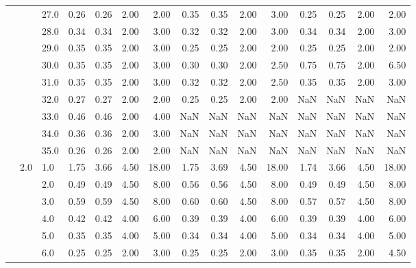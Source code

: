 \begin{tabular}{lllrrrrrrrrrrrr}
      &     & 27.0 &       0.26 &      0.26 & 2.00 &   2.00 &       0.35 &      0.35 & 2.00 &   3.00 &       0.25 &      0.25 & 2.00 &   2.00 \\
      &     & 28.0 &       0.34 &      0.34 & 2.00 &   3.00 &       0.32 &      0.32 & 2.00 &   3.00 &       0.34 &      0.34 & 2.00 &   3.00 \\
      &     & 29.0 &       0.35 &      0.35 & 2.00 &   3.00 &       0.25 &      0.25 & 2.00 &   2.00 &       0.25 &      0.25 & 2.00 &   2.00 \\
      &     & 30.0 &       0.35 &      0.35 & 2.00 &   3.00 &       0.30 &      0.30 & 2.00 &   2.50 &       0.75 &      0.75 & 2.00 &   6.50 \\
      &     & 31.0 &       0.35 &      0.35 & 2.00 &   3.00 &       0.32 &      0.32 & 2.00 &   2.50 &       0.35 &      0.35 & 2.00 &   3.00 \\
      &     & 32.0 &       0.27 &      0.27 & 2.00 &   2.00 &       0.25 &      0.25 & 2.00 &   2.00 &        NaN &       NaN &  NaN &    NaN \\
      &     & 33.0 &       0.46 &      0.46 & 2.00 &   4.00 &        NaN &       NaN &  NaN &    NaN &        NaN &       NaN &  NaN &    NaN \\
      &     & 34.0 &       0.36 &      0.36 & 2.00 &   3.00 &        NaN &       NaN &  NaN &    NaN &        NaN &       NaN &  NaN &    NaN \\
      &     & 35.0 &       0.26 &      0.26 & 2.00 &   2.00 &        NaN &       NaN &  NaN &    NaN &        NaN &       NaN &  NaN &    NaN \\
      & 2.0 & 1.0  &       1.75 &      3.66 & 4.50 &  18.00 &       1.75 &      3.69 & 4.50 &  18.00 &       1.74 &      3.66 & 4.50 &  18.00 \\
      &     & 2.0  &       0.49 &      0.49 & 4.50 &   8.00 &       0.56 &      0.56 & 4.50 &   8.00 &       0.49 &      0.49 & 4.50 &   8.00 \\
      &     & 3.0  &       0.59 &      0.59 & 4.50 &   8.00 &       0.60 &      0.60 & 4.50 &   8.00 &       0.57 &      0.57 & 4.50 &   8.00 \\
      &     & 4.0  &       0.42 &      0.42 & 4.00 &   6.00 &       0.39 &      0.39 & 4.00 &   6.00 &       0.39 &      0.39 & 4.00 &   6.00 \\
      &     & 5.0  &       0.35 &      0.35 & 4.00 &   5.00 &       0.34 &      0.34 & 4.00 &   5.00 &       0.34 &      0.34 & 4.00 &   5.00 \\
      &     & 6.0  &       0.25 &      0.25 & 2.00 &   3.00 &       0.25 &      0.25 & 2.00 &   3.00 &       0.35 &      0.35 & 2.00 &   4.50 \\

\end{tabular}

